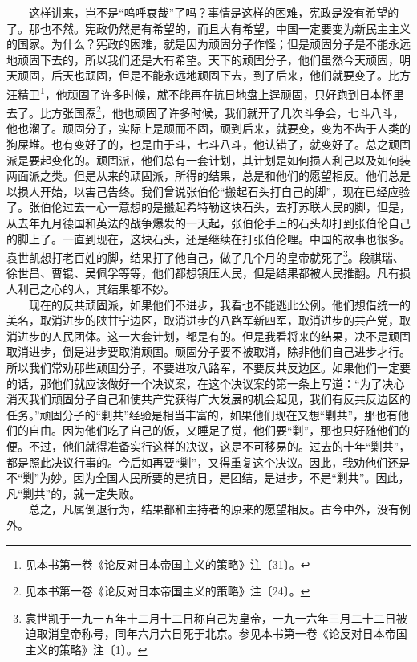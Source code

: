 \documentclass[cn,11pt,chinese]{elegantbook}
\begin{document}
　　这样讲来，岂不是“呜呼哀哉”了吗？事情是这样的困难，宪政是没有希望的了。那也不然。宪政仍然是有希望的，而且大有希望，中国一定要变为新民主主义的国家。为什么？宪政的困难，就是因为顽固分子作怪；但是顽固分子是不能永远地顽固下去的，所以我们还是大有希望。天下的顽固分子，他们虽然今天顽固，明天顽固，后天也顽固，但是不能永远地顽固下去，到了后来，他们就要变了。比方汪精卫\footnote[9]{ 见本书第一卷《论反对日本帝国主义的策略》注〔31〕。}，他顽固了许多时候，就不能再在抗日地盘上逞顽固，只好跑到日本怀里去了。比方张国焘\footnote[10]{ 见本书第一卷《论反对日本帝国主义的策略》注〔24〕。}，他也顽固了许多时候，我们就开了几次斗争会，七斗八斗，他也溜了。顽固分子，实际上是顽而不固，顽到后来，就要变，变为不齿于人类的狗屎堆。也有变好了的，也是由于斗，七斗八斗，他认错了，就变好了。总之顽固派是要起变化的。顽固派，他们总有一套计划，其计划是如何损人利己以及如何装两面派之类。但是从来的顽固派，所得的结果，总是和他们的愿望相反。他们总是以损人开始，以害己告终。我们曾说张伯伦“搬起石头打自己的脚”，现在已经应验了。张伯伦过去一心一意想的是搬起希特勒这块石头，去打苏联人民的脚，但是，从去年九月德国和英法的战争爆发的一天起，张伯伦手上的石头却打到张伯伦自己的脚上了。一直到现在，这块石头，还是继续在打张伯伦哩。中国的故事也很多。袁世凯想打老百姓的脚，结果打了他自己，做了几个月的皇帝就死了\footnote[11]{ 袁世凯于一九一五年十二月十二日称自己为皇帝，一九一六年三月二十二日被迫取消皇帝称号，同年六月六日死于北京。参见本书第一卷《论反对日本帝国主义的策略》注〔1〕。}。段祺瑞、徐世昌、曹锟、吴佩孚等等，他们都想镇压人民，但是结果都被人民推翻。凡有损人利己之心的人，其结果都不妙。\\
　　现在的反共顽固派，如果他们不进步，我看也不能逃此公例。他们想借统一的美名，取消进步的陕甘宁边区，取消进步的八路军新四军，取消进步的共产党，取消进步的人民团体。这一大套计划，都是有的。但是我看将来的结果，决不是顽固取消进步，倒是进步要取消顽固。顽固分子要不被取消，除非他们自己进步才行。所以我们常劝那些顽固分子，不要进攻八路军，不要反共反边区。如果他们一定要的话，那他们就应该做好一个决议案，在这个决议案的第一条上写道：“为了决心消灭我们顽固分子自己和使共产党获得广大发展的机会起见，我们有反共反边区的任务。”顽固分子的“剿共”经验是相当丰富的，如果他们现在又想“剿共”，那也有他们的自由。因为他们吃了自己的饭，又睡足了觉，他们要“剿”，那也只好随他们的便。不过，他们就得准备实行这样的决议，这是不可移易的。过去的十年“剿共”，都是照此决议行事的。今后如再要“剿”，又得重复这个决议。因此，我劝他们还是不“剿”为妙。因为全国人民所要的是抗日，是团结，是进步，不是“剿共”。因此，凡“剿共”的，就一定失败。\\
　　总之，凡属倒退行为，结果都和主持者的原来的愿望相反。古今中外，没有例外。\\
\end{document}

